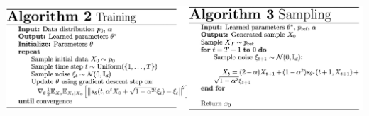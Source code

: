 \includegraphics[width=\columnwidth]{figures/generative_diffusion_training_sampling.png}

















